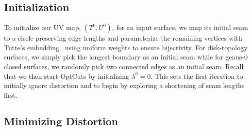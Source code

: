 \subsection{Initialization}
To initialize our UV map, $(T^0,U^0)$, for an input surface, we map its initial seam to a circle preserving edge lengths and parameterize the remaining vertices with Tutte's embedding~ using uniform weights to ensure bijectivity.
For disk-topology surfaces, we simply pick the longest boundary as an initial seam while for genus-0 closed surfaces, we randomly pick two connected edges as an initial seam. 
Recall that we then start OptCuts by initializing $\lambda^0 = 0$. This sets the first iteration to initially ignore distortion and to begin by exploring a shortening of seam lengths first.


\subsection{Minimizing Distortion}
\label{sec:descentStep}


